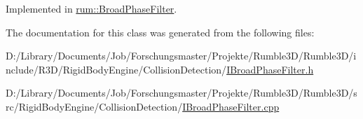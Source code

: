 Implemented in \mbox{\hyperlink{classrum_1_1_broad_phase_filter_a093dbf88b707226854b0042d60a1b128}{rum\+::\+Broad\+Phase\+Filter}}.



The documentation for this class was generated from the following files\+:\begin{DoxyCompactItemize}
\item 
D\+:/\+Library/\+Documents/\+Job/\+Forschungsmaster/\+Projekte/\+Rumble3\+D/\+Rumble3\+D/include/\+R3\+D/\+Rigid\+Body\+Engine/\+Collision\+Detection/\mbox{\hyperlink{_i_broad_phase_filter_8h}{I\+Broad\+Phase\+Filter.\+h}}\item 
D\+:/\+Library/\+Documents/\+Job/\+Forschungsmaster/\+Projekte/\+Rumble3\+D/\+Rumble3\+D/src/\+Rigid\+Body\+Engine/\+Collision\+Detection/\mbox{\hyperlink{_i_broad_phase_filter_8cpp}{I\+Broad\+Phase\+Filter.\+cpp}}\end{DoxyCompactItemize}
